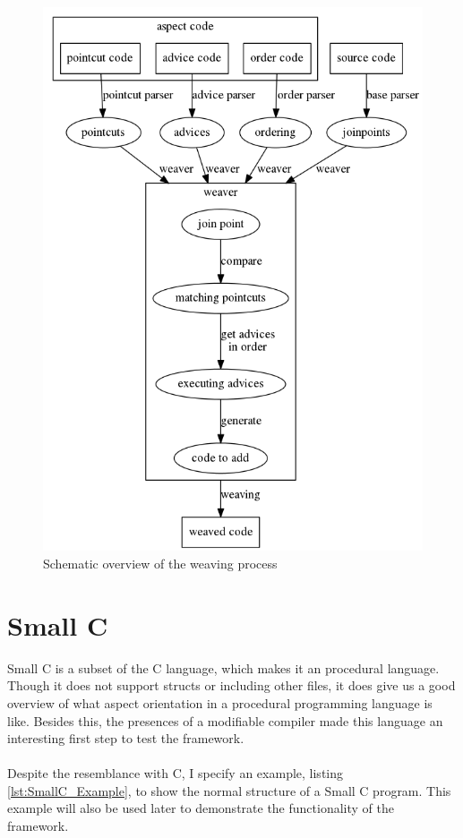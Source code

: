 \documentclass[a4paper]{report}
\begin{document}
\begin{figure}
\centering
\includegraphics[scale=0.5]{images/AOF/weaving.png}
\caption{Schematic overview of the weaving process}
\label{fig:Weaving}
\end{figure}

\chapter{Small C}
\label{chap:SmallC}
Small C is a subset of the C language, which makes it an procedural language. Though it does not support structs or including other files, it does give us a good overview of what aspect orientation in a procedural programming language is like. Besides this, the presences of a modifiable compiler made this language an interesting first step to test the framework.\\
\\
Despite the resemblance with C, I specify an example, listing \ref{lst:SmallC_Example}, to show the normal structure of a Small C program. This example will also be used later to demonstrate the functionality of the framework.
\end{document}
